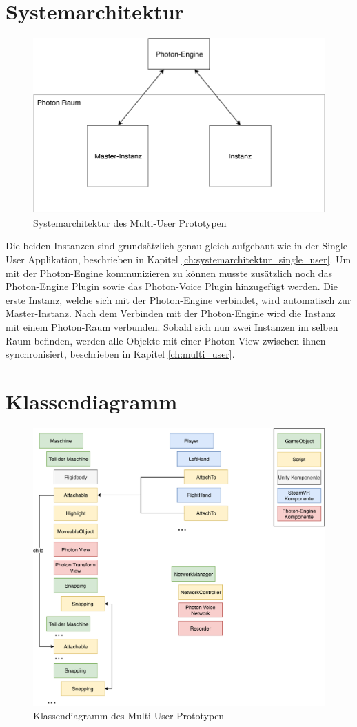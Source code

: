 \section{Systemarchitektur}
\begin{figure}[h!]
	\centering
	\includegraphics[keepaspectratio,width=0.60\linewidth]{img/ArchitekturT2.pdf}
	\caption{Systemarchitektur des Multi-User Prototypen}
	\label{fig:systemarchitektur_mutli_user}
\end{figure}

Die beiden Instanzen sind grundsätzlich genau gleich aufgebaut wie in der Single-User Applikation, beschrieben in Kapitel \ref{ch:systemarchitektur_single_user}. Um mit der Photon-Engine kommunizieren zu können musste zusätzlich noch das Photon-Engine Plugin sowie das Photon-Voice Plugin hinzugefügt werden. Die erste Instanz, welche sich mit der Photon-Engine verbindet, wird automatisch zur Master-Instanz. Nach dem Verbinden mit der Photon-Engine wird die Instanz mit einem Photon-Raum verbunden. Sobald sich nun zwei Instanzen im selben Raum befinden, werden alle Objekte mit einer Photon View zwischen ihnen synchronisiert, beschrieben in Kapitel \ref{ch:multi_user}.

\section{Klassendiagramm}

\begin{figure}[h!]
	\centering
	\includegraphics[keepaspectratio,width=0.65\linewidth]{img/Klassendiagramm_T2.pdf}
	\caption{Klassendiagramm des Multi-User Prototypen}
	\label{fig:klassendiagramm_multi_user}
\end{figure}

